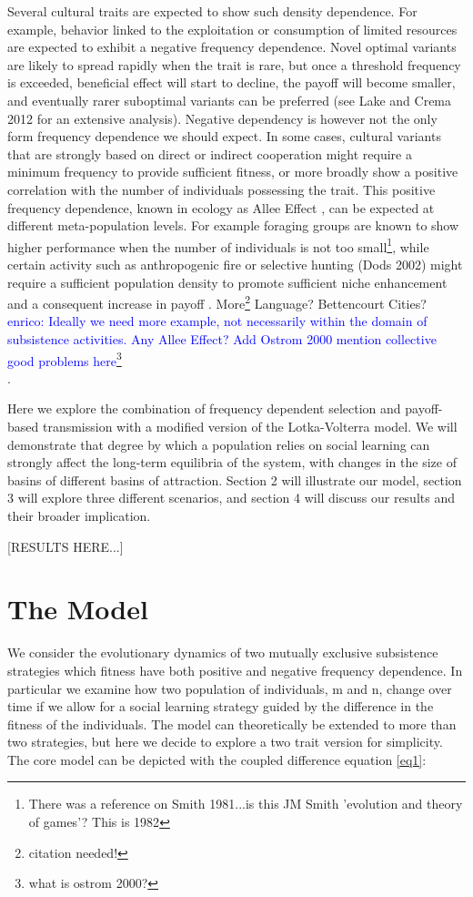 \documentclass[preprint,authoryear]{elsarticle}
\newcommand{\memo}[2]{\textcolor{#1}{#2}}
\newcommand{\enrico}[1]{\memo{blue}{enrico: #1\\}}
\begin{document}
Several cultural traits are expected to show such density dependence. For example, behavior linked to the exploitation or consumption of limited resources are expected to exhibit a negative frequency dependence. Novel optimal variants are likely to spread rapidly when the trait is rare, but once a threshold frequency is exceeded,  beneficial effect will start to decline, the payoff will become smaller, and eventually rarer suboptimal variants can be preferred (see Lake and Crema 2012 for an extensive analysis). Negative dependency is however not the only form frequency dependence we should expect. In some cases, cultural variants that are strongly based on direct or indirect cooperation might require a minimum frequency to provide sufficient fitness, or more broadly show a positive correlation with the number of individuals possessing the trait. This positive frequency dependence, known in ecology as Allee Effect \citep{allee1958}, can be expected at different meta-population levels. For example foraging groups are known to show higher performance when the number of individuals is not too small\footnote{There was a reference on Smith 1981...is this JM Smith 'evolution and theory of games'? This is 1982}, while certain activity such as anthropogenic fire \citep{bird2013} or selective hunting (Dods 2002) might require a sufficient population density to promote sufficient niche enhancement and a consequent increase in payoff \citep{rowley2011}. More\footnote{citation needed!} Language? Bettencourt Cities? \enrico{Ideally we need more example, not necessarily within the domain of subsistence activities. Any Allee Effect? Add Ostrom 2000 mention collective good problems here\footnote{what is ostrom 2000?}}.

Here we explore the combination of frequency dependent selection and payoff-based transmission with a modified version of the Lotka-Volterra model. We will demonstrate that degree by which a population relies on social learning can strongly affect the long-term equilibria of the system, with changes in the size of basins of different basins of attraction. Section 2 will illustrate our model, section 3 will explore three different scenarios, and section 4 will discuss our results and their broader implication. 

[RESULTS HERE...]

\section{The Model}
We consider the evolutionary dynamics of two mutually exclusive subsistence strategies which fitness have both positive and negative frequency dependence. In particular we examine how two population of individuals, m and n, change over time if we allow for a social learning strategy guided by the difference in the fitness of the individuals. The model can theoretically be extended to more than two strategies, but here we decide to explore a two trait version for simplicity. The core model can be depicted with the coupled difference equation \eqref{eq1}:
\end{document}
